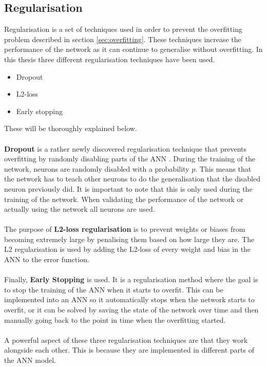 \subsection{Regularisation}\label{sec:regularisation}
Regularisation is a set of techniques used in order to prevent the overfitting problem described in section \ref{sec:overfitting}. These techniques increase the performance of the network as it can continue to generalise without overfitting. 
In this thesis three different regularisation techniques have been used.
\begin{itemize}
    \item Dropout
    \item L2-loss
    \item Early stopping
\end{itemize}
These will be thoroughly explained below.
\\\\
\textbf{Dropout} is a rather newly discovered regularisation technique that prevents overfitting by randomly disabling parts of the ANN \parencite{srivastava2014dropout}. During the training of the network, neurons are randomly disabled with a probability $p$. This means that the network has to teach other neurons to do the generalisation that the disabled neuron previously did. It is important to note that this is only used during the training of the network. When validating the performance of the network or actually using the network all neurons are used.
\\\\
The purpose of \textbf{L2-loss regularisation} is to prevent weights or biases from becoming extremely large by penalising them based on how large they are. The L2 regularisation is used by adding the L2-loss of every weight and bias in the ANN to the error function.
\\\\
Finally, \textbf{Early Stopping} is used. It is a regularisation method where the goal is to stop the training of the ANN when it starts to overfit. This can be implemented into an ANN so it automatically stops when the network starts to overfit, or it can be solved by saving the state of the network over time and then manually going back to the point in time when the overfitting started.
\\\\
A powerful aspect of these three regularisation techniques are that they work alongside each other. This is because they are implemented in different parts of the ANN model.

